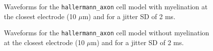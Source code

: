 \documentclass[final, a4paper,masters,en,listoffigures,listoftables,norwegiandates]{NMBU}
\begin{document}
\begin{figure}[htbp]
    \centering
    \caption{Waveforms for the \texttt{hallermann\_axon} cell model with myelination at the closest electrode (10 $\mu$m) and for a jitter SD of 2 ms.} 
    \label{fig:axonwavmyen}
\end{figure}

\begin{figure}[htbp]
    \centering
    \caption{Waveforms for the \texttt{hallermann\_axon} cell model without myelination at the closest electrode (10 $\mu$m) and for a jitter SD of 2 ms.} 
    \label{fig:axonwavunmyen}
\end{figure}
\end{document}
